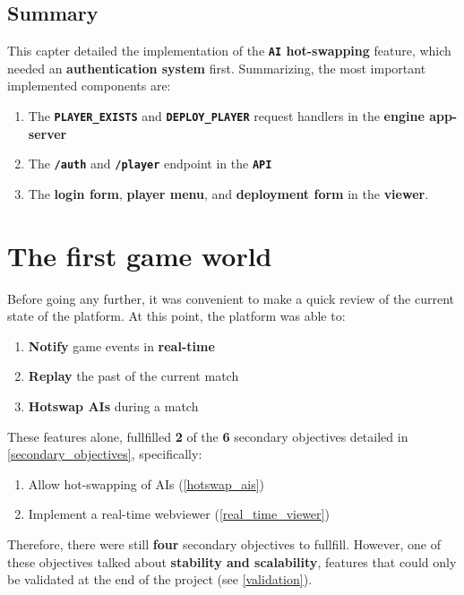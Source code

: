 \documentclass[a4paper,11pt,titlepage,abstract,numbers=noenddot,automark,mnsy,intlimits,rgb,dvipsnames]{report}
\begin{document}
\section{Summary}
This capter detailed the implementation of the \textbf{\texttt{AI} hot-swapping} feature, which needed an
\textbf{authentication system} first. Summarizing, the most important implemented components are:
\begin{enumerate}
\item
The \textbf{\texttt{PLAYER\_EXISTS}} and \textbf{\texttt{DEPLOY\_PLAYER}} request handlers in the \textbf{engine app-server}
\item
The \textbf{\texttt{/auth}} and \textbf{\texttt{/player}} endpoint in the \textbf{\texttt{API}}
\item
The \textbf{login form}, \textbf{player menu}, and \textbf{deployment form} in the \textbf{viewer}.
\end{enumerate}
\chapter{The first game world}
Before going any further, it was convenient to make a quick review of the current state of the platform. At this point,
the platform was able to:
\begin{enumerate}
\item
\textbf{Notify} game events in \textbf{real-time}
\item
\textbf{Replay} the past of the current match
\item
\textbf{Hotswap AIs} during a match
\end{enumerate}
These features alone, fullfilled \textbf{2} of the \textbf{6} secondary objectives detailed in \autoref{secondary_objectives},
specifically:
\begin{enumerate}
\item
Allow hot-swapping of AIs (\autoref{hotswap_ais})
\item
Implement a real-time webviewer (\autoref{real_time_viewer})
\end{enumerate}
Therefore, there were still \textbf{four} secondary objectives to fullfill. However, one of these objectives talked about
\textbf{stability and scalability}, features that could only be validated at the end of the project (see \autoref{validation}).
\end{document}
